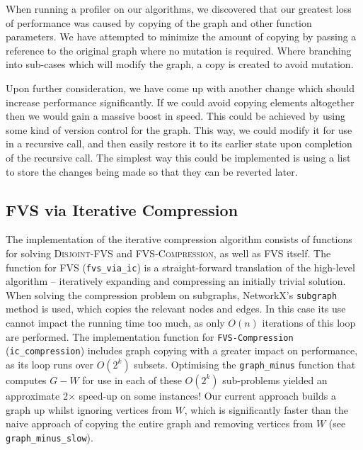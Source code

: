 \documentclass[a4paper,12pt]{article}
\begin{document}
When running a profiler on our algorithms, we discovered that our greatest loss of performance was caused by copying of the graph and other function parameters. We have attempted to minimize the amount of copying by passing a reference to the original graph where no mutation is required. Where branching into sub-cases which will modify the graph, a copy is created to avoid mutation.

Upon further consideration, we have come up with another change which should increase performance significantly. If we could avoid copying elements altogether then we would gain a massive boost in speed. This could be achieved by using some kind of version control for the graph. This way, we could modify it for use in a recursive call, and then easily restore it to its earlier state upon completion of the recursive call. The simplest way this could be implemented is using a list to store the changes being made so that they can be reverted later.


\subsection{FVS via Iterative Compression}

The implementation of the iterative compression algorithm consists of functions for solving \textsc{Disjoint-FVS} and \textsc{FVS-Compression}, as well as \textsc{FVS} itself. The function for \textsc{FVS} (\texttt{fvs\_via\_ic}) is a straight-forward translation of the high-level algorithm -- iteratively expanding and compressing an initially trivial solution. When solving the compression problem on subgraphs, NetworkX's \texttt{subgraph} method is used, which copies the relevant nodes and edges. In this case its use cannot impact the running time too much, as only $O(n)$ iterations of this loop are performed. The implementation function for \texttt{FVS-Compression} (\texttt{ic\_compression}) includes graph copying with a greater impact on performance, as its loop runs over $O(2^k)$ subsets. Optimising the \texttt{graph\_minus} function that computes $G - W$ for use in each of these $O(2^k)$ sub-problems yielded an approximate 2$\times$ speed-up on some instances! Our current approach builds a graph up whilst ignoring vertices from $W$, which is significantly faster than the naive approach of copying the entire graph and removing vertices from $W$ (see \texttt{graph\_minus\_slow}).
\end{document}
